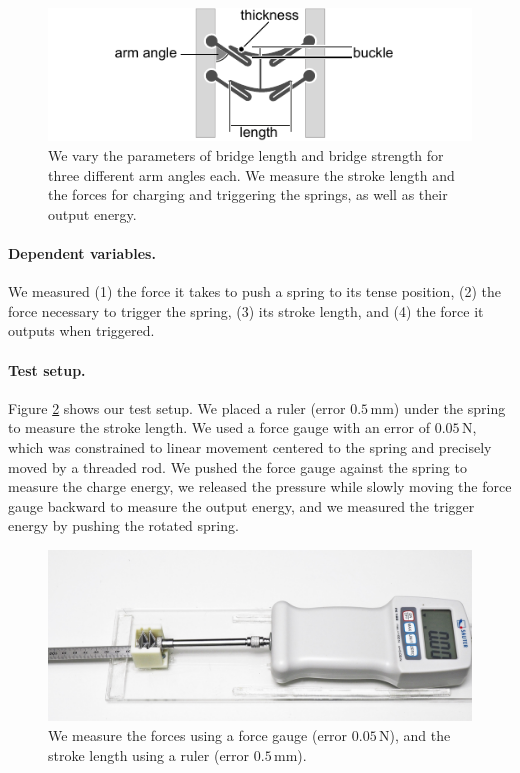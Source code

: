 \begin{figure} [h]  
    \includegraphics[width=\textwidth]{chapters/digital-metamaterials-FIG/24-spring-details.pdf}
    \caption[Short figure name.]{We vary the parameters of bridge length and bridge strength for three different arm angles each. We measure the stroke length and the forces for charging and triggering the springs, as well as their output energy.
    \label{fig:24-spring-details}}
\end{figure}

\paragraph{Dependent variables.} We measured (1) the force it takes to push a spring to its tense position, (2) the force necessary to trigger the spring, (3) its stroke length, and (4) the force it outputs when triggered. 

\paragraph{Test setup.} Figure \ref{fig:25-measurement-setup} shows our test setup. We placed a ruler (error $0.5\, \mathrm{mm}$) under the spring to measure the stroke length. We used a force gauge with an error of $0.05\, \mathrm{N}$, which was constrained to linear movement centered to the spring and precisely moved by a threaded rod. We pushed the force gauge against the spring to measure the charge energy, we released the pressure while slowly moving the force gauge backward to measure the output energy, and we measured the trigger energy by pushing the rotated spring.

\begin{figure} [h]  
    \includegraphics[width=\textwidth]{chapters/digital-metamaterials-FIG/25-measurement-setup.jpg}
    \caption[Short figure name.]{We measure the forces using a force gauge (error $0.05\, \mathrm{N}$), and the stroke length using a ruler (error $0.5\, \mathrm{mm}$).
    \label{fig:25-measurement-setup}}
\end{figure}

